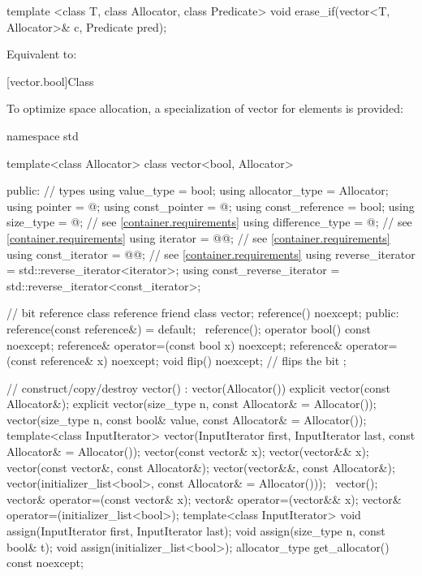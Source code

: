 %
\begin{itemdecl}
template <class T, class Allocator, class Predicate>
  void erase_if(vector<T, Allocator>& c, Predicate pred);
\end{itemdecl}

\begin{itemdescr}
\pnum
\effects
Equivalent to: 
\end{itemdescr}

[vector.bool]{Class }

\pnum
{}%
To optimize space allocation, a specialization of vector for
elements is provided:

\begin{codeblock}
namespace std {
  template<class Allocator>
  class vector<bool, Allocator> {
  public:
    // types
    using value_type             = bool;
    using allocator_type         = Allocator;
    using pointer                = @\impdef@;
    using const_pointer          = @\impdef@;
    using const_reference        = bool;
    using size_type              = @\impdef@; // see \ref{container.requirements}
    using difference_type        = @\impdef@; // see \ref{container.requirements}
    using iterator               = @@; // see \ref{container.requirements}
    using const_iterator         = @@; // see \ref{container.requirements}
    using reverse_iterator       = std::reverse_iterator<iterator>;
    using const_reverse_iterator = std::reverse_iterator<const_iterator>;

    // bit reference
    class reference {
      friend class vector;
      reference() noexcept;
    public:
      reference(const reference&) = default;
      ~reference();
      operator bool() const noexcept;
      reference& operator=(const bool x) noexcept;
      reference& operator=(const reference& x) noexcept;
      void flip() noexcept;     // flips the bit
    };

    // construct/copy/destroy
    vector() : vector(Allocator()) { }
    explicit vector(const Allocator&);
    explicit vector(size_type n, const Allocator& = Allocator());
    vector(size_type n, const bool& value, const Allocator& = Allocator());
    template<class InputIterator>
      vector(InputIterator first, InputIterator last, const Allocator& = Allocator());
    vector(const vector& x);
    vector(vector&& x);
    vector(const vector&, const Allocator&);
    vector(vector&&, const Allocator&);
    vector(initializer_list<bool>, const Allocator& = Allocator()));
    ~vector();
    vector& operator=(const vector& x);
    vector& operator=(vector&& x);
    vector& operator=(initializer_list<bool>);
    template<class InputIterator>
      void assign(InputIterator first, InputIterator last);
    void assign(size_type n, const bool& t);
    void assign(initializer_list<bool>);
    allocator_type get_allocator() const noexcept;

}}
\end{codeblock}
